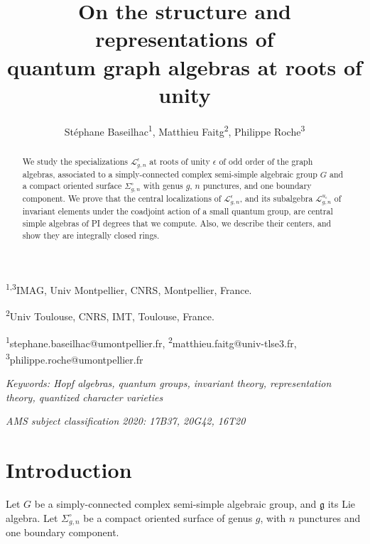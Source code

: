 \documentclass[11pt]{amsart}
\title[Quantum graph algebras at roots of unity]{On the structure and representations of \\ quantum graph algebras at roots of unity}
\author[St\'ephane Baseilhac, Matthieu Faitg, Philippe Roche]{St\'ephane Baseilhac\textsuperscript{1}, Matthieu Faitg\textsuperscript{2}, Philippe Roche\textsuperscript{3}}
\newcommand{\e}{\epsilon}
\newcommand{\Ll}{\mathcal{L}}
\begin{document}
\maketitle

\begin{center}
\textsuperscript{1,3}IMAG, Univ Montpellier, CNRS, Montpellier, France.


\textsuperscript{2}Univ Toulouse, CNRS, IMT, Toulouse, France.

\medskip

\textsuperscript{1}stephane.baseilhac@umontpellier.fr, \textsuperscript{2}matthieu.faitg@univ-tlse3.fr, \textsuperscript{3}philippe.roche@umontpellier.fr
\end{center}

\begin{abstract} We study the specializations $\Ll_{g,n}^\e$ at roots of unity $\e$ of odd order of the graph algebras, associated to a simply-connected complex semi-simple algebraic group $G$ and a compact oriented surface $\Sigma_{g,n}^{\circ}$ with genus $g$, $n$ punctures, and one boundary component. We prove that the central localizations of $\Ll_{g,n}^\e$, and its subalgebra $\Ll_{g,n}^{u_\e}$ of invariant elements under the coadjoint action of a small quantum group, are central simple algebras of PI degrees that we compute. Also, we describe their centers, and show they are integrally closed rings.   
\end{abstract} 
\medskip

{\it Keywords: Hopf algebras, quantum groups, invariant theory, representation theory, quantized character varieties}

{\it AMS subject classification 2020:  17B37, 20G42, 16T20} 

\tableofcontents

\section{Introduction}
Let $G$ be a simply-connected complex semi-simple algebraic group, and $\mathfrak{g}$ its Lie algebra. Let $\Sigma_{g,n}^{\circ}$ be a compact oriented surface of genus $g$, with $n$ punctures and one boundary component.
\end{document}

